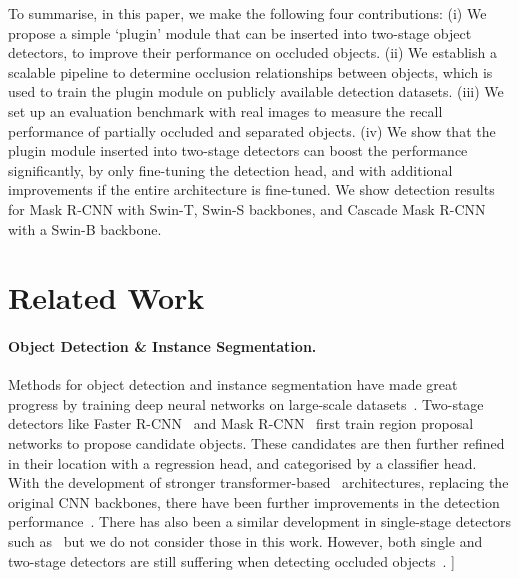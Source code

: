 \documentclass{bmvc2k}
\begin{document}
To summarise, in this paper, we make the following four contributions:
(i) We propose a simple `plugin' module that can be inserted into two-stage object detectors, to improve their performance on occluded objects.
(ii) We establish a scalable pipeline to determine occlusion relationships between objects,
which is used to train the plugin module on publicly available detection datasets.
(iii) We set up an evaluation benchmark with real images to measure the recall performance of partially occluded and separated objects.
(iv) We show that the plugin module inserted into two-stage detectors can boost the performance significantly, by only fine-tuning the detection head, and with additional improvements if 
the entire architecture is fine-tuned. We show detection results for Mask R-CNN with Swin-T, Swin-S backbones, and Cascade Mask R-CNN with a Swin-B backbone.





 \vspace{-0.4cm}
\section{Related Work}
\label{sec:related_work}


\paragraph{Object Detection \& Instance Segmentation.}
Methods for
object detection and instance segmentation have made great progress
by training deep neural networks on large-scale datasets~\cite{everingham2010pascal, coco_dataset, openimages_2020}.
Two-stage detectors like Faster R-CNN~\cite{faster_rcnn} and Mask R-CNN~\cite{mask_rcnn} first train region proposal networks to propose candidate objects. These candidates are then further refined in their location with a regression head, and categorised by a classifier head. With the development of stronger transformer-based~\cite{liu2021Swin, liu2021swinv2} architectures, replacing the original CNN backbones, there have been further improvements in the detection performance~\cite{liu2021Swin}. There has also been a similar development in single-stage detectors such as~\cite{carion2020detr, zhu2020deformable_detr, cheng2022masked} but we do not consider those in this work.
However, both single and two-stage detectors are still suffering when detecting occluded objects~\cite{saleh2021survey_occlusion}. 
\-0.9cm]
\end{document}

